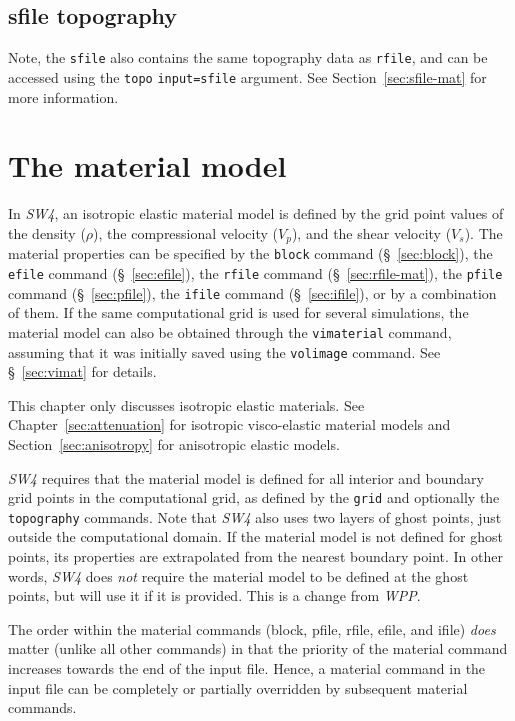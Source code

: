 \documentclass[11pt]{report}
\begin{document}
\section{sfile topography}\label{sec:topo-sfile}
Note, the \verb+sfile+ also contains the same topography data as \verb+rfile+, and can be accessed using 
the \verb+topo+ \verb+input=sfile+ argument.
See Section~\ref{sec:sfile-mat} for more information.



\chapter{The material model} \label{sec:material}

In \emph{SW4}, an isotropic elastic material model is defined by the grid point values of the density
($\rho$), the compressional velocity ($V_p$), and the shear velocity ($V_s$). The material
properties can be specified by the \verb+block+ command (\S~\ref{sec:block}), the \verb+efile+
command (\S~\ref{sec:efile}), the \verb+rfile+ command (\S~\ref{sec:rfile-mat}), the \verb+pfile+
command (\S~\ref{sec:pfile}), the \verb+ifile+ command (\S~\ref{sec:ifile}), or by a combination of
them. If the same computational grid is used for several simulations, the material model can also be
obtained through the \verb+vimaterial+ command, assuming that it was initially saved using the
\verb+volimage+ command. See \S~\ref{sec:vimat} for details.

This chapter only discusses isotropic elastic materials. See Chapter~\ref{sec:attenuation} for
isotropic visco-elastic material models and Section~\ref{sec:anisotropy} for anisotropic elastic
models.

\emph{SW4} requires that the material model is defined for all interior and boundary grid points in
the computational grid, as defined by the {\tt grid} and optionally the {\tt topography}
commands. Note that \emph{SW4} also uses two layers of ghost points, just outside the computational
domain. If the material model is not defined for ghost points, its properties are extrapolated from
the nearest boundary point. In other words, \emph{SW4} does {\em not} require the material model to
be defined at the ghost points, but will use it if it is provided. This is a change from
\emph{WPP}.

The order within the material commands (block, pfile, rfile, efile, and ifile) {\em does} matter (unlike
all other commands) in that the priority of the material command increases towards the end of the
input file. Hence, a material command in the input file can be completely or partially overridden by
subsequent material commands.
\end{document}
